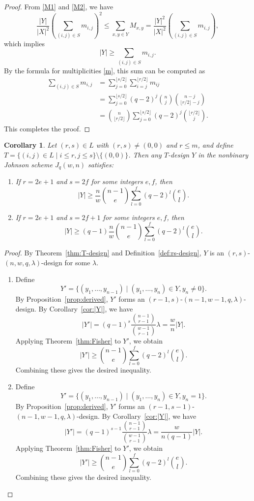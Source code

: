 \documentclass[a4paper, 11pt]{article}
\newtheorem{corollary}[theorem]{Corollary}
\theoremstyle{definition}
\begin{document}
\begin{proof}
From \eqref{M1} and \eqref{M2}, we have
\[
\frac{|Y|}{|X|^2}\left(\sum_{(i,j) \in S} m_{i,j} \right)^2 \le \sum_{x,y \in Y} M_{x,y} = \frac{|Y|^2}{|X|^2}\left(\sum_{(i,j) \in S} m_{i,j} \right),
\]
which implies
\[
|Y| \ge \sum_{(i,j) \in S} m_{i,j}.
\]
By the formula for multiplicities \eqref{m}, this sum can be computed as
\begin{align*}
\sum_{(i,j) \in S} m_{i,j} &= \sum_{j = 0}^{\lfloor s / 2 \rfloor} \sum_{i = j}^{\lfloor r / 2 \rfloor} m_{ij} \\
&= \sum_{j = 0}^{\lfloor s / 2 \rfloor} (q-2)^j \binom{n}{j} \binom{n-j}{\lfloor r / 2 \rfloor-j} \\
&= \binom{n}{\lfloor r / 2 \rfloor}  \sum_{j = 0}^{\lfloor s / 2 \rfloor} (q-2)^j \binom{\lfloor r / 2 \rfloor}{j}.
\end{align*}
This completes the proof.
\end{proof}

\begin{corollary}
Let $(r,s) \in L$ with $(r,s) \neq (0,0)$ and $r \leq m$, and define $T = \{(i,j) \in L \mid i \le r, j \le s\} \setminus \{(0,0)\}$.
Then any $T$-design $Y$ in the nonbinary Johnson scheme $J_q(w, n)$ satisfies:
\begin{enumerate}
\item If $r = 2e + 1$ and $s = 2f$ for some integers $e, f$, then
\[
|Y| \ge \frac{n}{w}\binom{n-1}{e} \sum_{l = 0}^f (q-2)^l \binom{e}{l}.
\]
\item If $r = 2e + 1$ and $s = 2f+1$ for some integers $e, f$, then
\[
|Y| \ge (q-1)\frac{n}{w}\binom{n-1}{e} \sum_{l = 0}^f (q-2)^l \binom{e}{l}.
\]
\end{enumerate}
\end{corollary}
\begin{proof}
By Theorem~\ref{thm:T-design} and Definition~\ref{def:rs-design}, $Y$ is an $(r,s)$-$(n,w,q,\lambda)$-design for some $\lambda$.
\begin{enumerate}
\item Define
\[
Y' = \{(y_1,\ldots,y_{n-1}) \mid (y_1,\ldots,y_n) \in Y, y_n \neq 0\}.
\]
By Proposition~\ref{prop:derived},
$Y'$ forms an $(r-1,s)$-$(n-1,w-1,q,\lambda)$-design.
By Corollary~\ref{cor:|Y|}, we have
\[
|Y'| = (q-1)^s \frac{\binom{n-1}{r-1}}{\binom{w-1}{r-1}} \lambda = \frac{w}{n} |Y|.
\]
Applying Theorem~\ref{thm:Fisher} to $Y'$, we obtain 
\[
|Y'| \ge \binom{n-1}{e} \sum_{l = 0}^f (q-2)^l \binom{e}{l}.
\]
Combining these gives the desired inequality.
\item Define
\[
Y' = \{(y_1,\ldots,y_{n-1}) \mid (y_1,\ldots,y_n) \in Y, y_n = 1\}.
\]
By Proposition~\ref{prop:derived}, $Y'$ forms an $(r-1,s-1)$-$(n-1,w-1,q,\lambda)$-design.
By Corollary~\ref{cor:|Y|}, we have
\[
|Y'| = (q-1)^{s-1} \frac{\binom{n-1}{r-1}}{\binom{w-1}{r-1}} \lambda = \frac{w}{n(q-1)} |Y|.
\]
Applying Theorem~\ref{thm:Fisher} to $Y'$, we obtain 
\[
|Y'| \ge \binom{n-1}{e} \sum_{l = 0}^f (q-2)^l \binom{e}{l}.
\]
Combining these gives the desired inequality.
\end{enumerate}
\end{proof}
\end{document}
